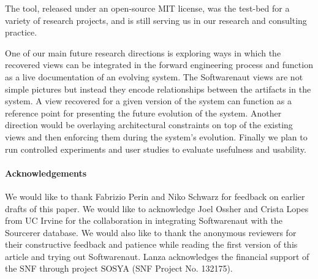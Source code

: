\documentclass[preprint,12pt]{elsarticle}
\begin{document}
The tool, released under an open-source MIT license, was the test-bed for a variety of research projects, and is still serving us in our research and consulting practice.

One of our main future research directions is exploring ways in which the recovered views can be integrated in the forward engineering process and function as a live documentation of an evolving system. The Softwarenaut views are not simple pictures but instead they encode relationships between the artifacts in the system. A view recovered for a given version of the system can function as a reference point for presenting the future evolution of the system. Another direction would be overlaying architectural constraints on top of the existing views and then enforcing them during the system's evolution. Finally we plan to run controlled experiments and user studies to evaluate usefulness and usability.



\paragraph{Acknowledgements} We would like to thank Fabrizio Perin and Niko Schwarz for feedback on earlier drafts of this paper. We would like to acknowledge Joel Ossher and Crista Lopes from UC Irvine for the collaboration in integrating Softwarenaut with the Sourcerer database. We would also like to thank the anonymous reviewers for their constructive feedback and patience while reading the first version of this article and trying out Softwarenaut. Lanza acknowledges the financial support of the SNF through project SOSYA (SNF Project No. 132175).



\end{document}
